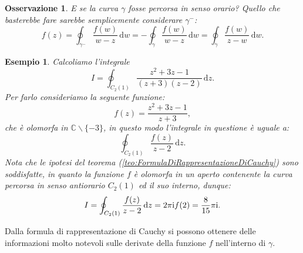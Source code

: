 \documentclass[11pt]{book}
\theoremstyle{Definizione}
\theoremstyle{TeoremaProposizioneLemmaCorollarioCongettura}
\theoremstyle{OsservazioneNotaEsempio}
\newtheorem{myobs}{Osservazione}[section]
\newtheorem{myes}{Esempio}[section]
\newcommand{\C}{\mathbb{C}}
\newcommand{\tolto}{\smallsetminus}
\renewcommand{\i}{\textup{i}}
\renewcommand{\d}{\mathrm{d}}
\newcommand{\dz}{\,\d z}
\newcommand{\dw}{\,\d w}
\begin{document}
\begin{myobs}
E se la curva $\gamma$ fosse percorsa in senso orario? Quello che basterebbe fare sarebbe semplicemente considerare $\gamma^-$:
$$
f(z) = \oint_{\gamma^-} \frac{f(w)}{w-z}\dw = -\oint_{\gamma} \frac{f(w)}{w-z}\dw = \oint_{\gamma} \frac{f(w)}{z-w}\dw.
$$
\end{myobs}
\begin{myes}
Calcoliamo l'integrale 
$$
I = \oint_{C_2(1)} \frac{z^2+3z-1}{(z+3)(z-2)}\dz.
$$
Per farlo consideriamo la seguente funzione:
$$
f(z) = \frac{z^2+3z-1}{z+3},
$$
che è olomorfa in $\C\tolto \{-3\}$, in questo modo l'integrale in questione è uguale a:
$$
\oint_{C_2(1)} \frac{f(z)}{z-2}\dz.
$$
Nota che le ipotesi del teorema (\ref{teo:FormulaDiRappresentazioneDiCauchy}) sono soddisfatte, in quanto la funzione $f$ è olomorfa in un aperto contenente la curva percorsa in senso antiorario $C_2(1)$ ed il suo interno, dunque:
$$
I = \oint_{C_2(1)} \frac{f(z)}{z-2}\dz = 2\pi\i f(2) = \frac{8}{15}\pi\i.
$$
\end{myes}
Dalla formula di rappresentazione di Cauchy si possono ottenere delle informazioni molto notevoli sulle derivate della funzione $f$ nell'interno di $\gamma$.
\end{document}
